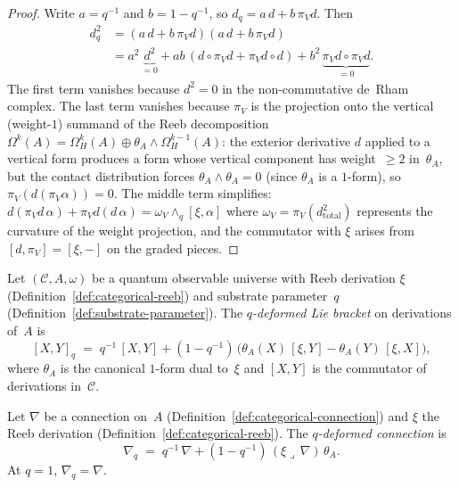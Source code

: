\begin{proof}
Write $a = q^{-1}$ and $b = 1 - q^{-1}$, so $d_q = a\,d + b\,\pi_V d$.
Then
\begin{align*}
  d_q^2
  &= (a\,d + b\,\pi_V d)(a\,d + b\,\pi_V d) \\
  &= a^2\,\underbrace{d^2}_{= 0}
     + ab\,(d \circ \pi_V d + \pi_V d \circ d)
     + b^2\,\underbrace{\pi_V d \circ \pi_V d}_{= 0}.
\end{align*}
The first term vanishes because $d^2 = 0$ in the non-commutative
de~Rham complex.  The last term vanishes because $\pi_V$ is the projection onto the
vertical (weight-$1$) summand of the Reeb decomposition
$\Omega^k(A) = \Omega^k_H(A) \oplus \theta_A \wedge \Omega^{k-1}_H(A)$:
the exterior derivative $d$ applied to a vertical form produces a form
whose vertical component has weight~$\geq 2$ in~$\theta_A$, but the
contact distribution forces $\theta_A \wedge \theta_A = 0$
(since $\theta_A$ is a $1$-form), so $\pi_V(d(\pi_V\alpha)) = 0$.
The middle term simplifies:
$d(\pi_V d\,\alpha) + \pi_V d(d\,\alpha) = \omega_V \wedge_q [\xi, \alpha]$
where $\omega_V = \pi_V(d^2_{\text{total}})$ represents the curvature
of the weight projection, and the commutator with $\xi$ arises
from $[d, \pi_V] = [\xi, {-}]$ on the graded pieces.
\end{proof}

\begin{definition}
\label{def:categorical-q-lie-bracket}
Let $(\mathcal{C}, A, \omega)$ be a quantum observable universe with
Reeb derivation $\xi$ (Definition~\ref{def:categorical-reeb}) and
substrate parameter~$q$ (Definition~\ref{def:substrate-parameter}).
The \emph{$q$-deformed Lie bracket} on derivations of~$A$ is
\[
  [X, Y]_q \;=\; q^{-1}\,[X, Y]
  + (1 - q^{-1})\,\bigl(\theta_A(X)\,[\xi, Y]
                        - \theta_A(Y)\,[\xi, X]\bigr),
\]
where $\theta_A$ is the canonical $1$-form dual to~$\xi$ and
$[X, Y]$ is the commutator of derivations in~$\mathcal{C}$.
\end{definition}

\begin{definition}
\label{def:categorical-q-connection}
Let $\nabla$ be a connection on~$A$
(Definition~\ref{def:categorical-connection}) and $\xi$ the Reeb
derivation (Definition~\ref{def:categorical-reeb}).  The
\emph{$q$-deformed connection} is
\[
  \nabla_q \;=\; q^{-1}\,\nabla
  + (1 - q^{-1})\,(\xi \lrcorner\, \nabla)\,\theta_A.
\]
At $q = 1$, $\nabla_q = \nabla$.
\end{definition}

